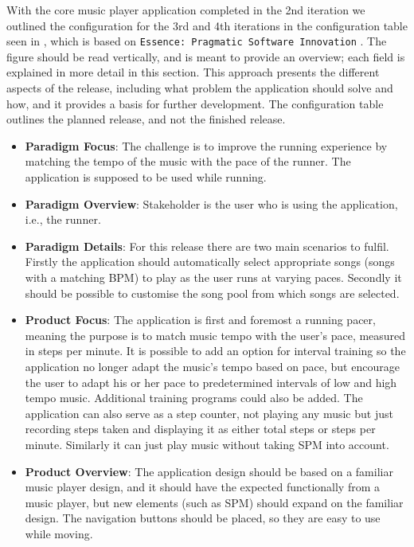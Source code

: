 With the core music player application completed in the 2nd iteration we outlined the configuration for the 3rd and 4th iterations in the configuration table seen in , which is based on \texttt{Essence: Pragmatic Software Innovation} \citep[ch. 3]{essence:config}. The figure should be read vertically, and is meant to provide an overview; each field is explained in more detail in this section. This approach presents the different aspects of the release, including what problem the application should solve and how, and it provides a basis for further development. The configuration table outlines the planned release, and not the finished release.




\begin{itemize}
\item \textbf{Paradigm Focus}: The challenge is to improve the running experience by matching the tempo of the music with the pace of the runner. The application is supposed to be used while running.

\item \textbf{Paradigm Overview}: Stakeholder is the user who is using the application, i.e., the runner.

\item \textbf{Paradigm Details}: For this release there are two main scenarios to fulfil. Firstly the application should automatically select appropriate songs (songs with a matching BPM) to play as the user runs at varying paces. Secondly it should be possible to customise the song pool from which songs are selected.

\item \textbf{Product Focus}: The application is first and foremost a running pacer, meaning the purpose is to match music tempo with the user's pace, measured in steps per minute. It is possible to add an option for interval training so the application no longer adapt the music's tempo based on pace, but encourage the user to adapt his or her pace to predetermined intervals of low and high tempo music. Additional training programs could also be added. The application can also serve as a step counter, not playing any music but just recording steps taken and displaying it as either total steps or steps per minute. Similarly it can just play music without taking SPM into account.

\item \textbf{Product Overview}: The application design should be based on a familiar music player design, and it should have the expected functionally from a music player, but new elements (such as SPM) should expand on the familiar design. The navigation buttons should be placed, so they are easy to use while moving.


\end{itemize}
